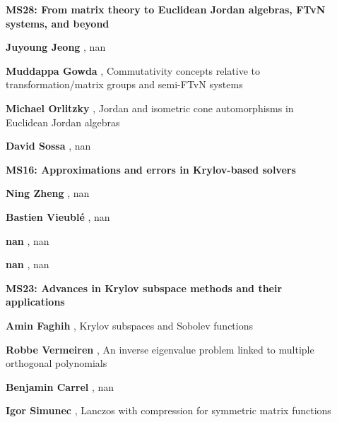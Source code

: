 \documentclass[ILAS2025-program.tex]{subfiles}
\begin{document}
\begin{description}
\begin{description}
        \end{description}
    \begin{description}
    \item[] {\color{mstitle}\textbf{MS28: From matrix theory to Euclidean Jordan algebras, FTvN systems, and beyond}} 
    \item[] \textbf{Juyoung Jeong} , nan
        \item[] \textbf{Muddappa Gowda} , Commutativity concepts relative to transformation/matrix groups and semi-FTvN systems
        \item[] \textbf{Michael Orlitzky} , Jordan and isometric cone automorphisms in Euclidean Jordan algebras
        \item[] \textbf{David Sossa} , nan
        \end{description}
    \begin{description}
    \item[] {\color{mstitle}\textbf{MS16: Approximations and errors in Krylov-based solvers}} 
    \item[] \textbf{Ning Zheng} , nan
        \item[] \textbf{Bastien Vieublé} , nan
        \item[] \textbf{nan} , nan
        \item[] \textbf{nan} , nan
        \end{description}
    \begin{description}
    \item[] {\color{mstitle}\textbf{MS23: Advances in Krylov subspace methods and their applications}} 
    \item[] \textbf{Amin Faghih} , Krylov subspaces and Sobolev functions
        \item[] \textbf{Robbe Vermeiren} , An inverse eigenvalue problem linked to multiple orthogonal polynomials

        \item[] \textbf{Benjamin Carrel} , nan
        \item[] \textbf{Igor Simunec} , Lanczos with compression for symmetric matrix functions
        \end{description}
    \end{description}
    \newpage
\end{document}
